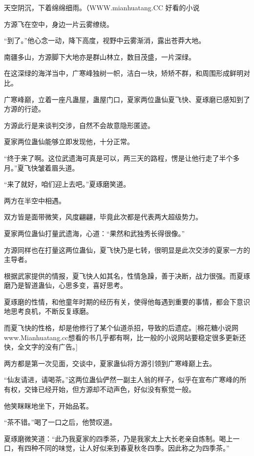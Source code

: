 
\begin{this_body}

天空阴沉，下着绵绵细雨。（WWW.mianhuatang.CC 好看的小说

方源飞在空中，身边一片云雾缭绕。

“到了。”他心念一动，降下高度，视野中云雾渐消，露出苍莽大地。

南疆多山，方源脚下大地亦是群山林立，数目茂盛，一片深绿。

在这深绿的海洋当中，广寒峰独树一帜，洁白一块，矫矫不群，和周围形成鲜明对比。

广寒峰巅，立着一座凡蛊屋，蛊屋门口，夏家两位蛊仙夏飞快、夏琢磨已感知到了方源的行迹。

方源此行是来谈判交涉，自然不会故意隐形匿迹。

夏家两位蛊仙能够立即发现他，十分正常。

“终于来了啊。这位武遗海可真是可以，两三天的路程，愣是让他行走了半个多月。”夏飞快皱着眉头道。

“来了就好，咱们迎上去吧。”夏琢磨笑道。

两方在半空中相遇。

双方皆是面带微笑，风度翩翩，毕竟此次都是代表两大超级势力。

夏家两位蛊仙打量武遗海，心道：“果然和武独秀长得很像。”

方源同样也在打量这两位蛊仙，夏飞快乃是七转，很明显是此次交涉的夏家一方的主导者。

根据武家提供的情报，夏飞快人如其名，性情急躁，善于决断，战力很强。而夏琢磨乃是智道蛊仙，心思多变，喜好思考。

夏琢磨的性情，和他童年时期的经历有关，使得他每遇到重要的事情，都会下意识地思考良机，不断反复琢磨。

而夏飞快的性格，却是他修行了某个仙道杀招，导致的后遗症。[棉花糖小说网www.Mianhuatang.cc想看的书几乎都有啊，比一般的小说网站要稳定很多更新还快，全文字的没有广告。]

两方都是第一次见面，交谈中，夏家蛊仙将方源引领到广寒峰巅上去。

“仙友请进，请喝茶。”这两位蛊仙俨然一副主人翁的样子，似乎在宣布广寒峰的所有权，交锋已经开始，但方源却不动声色，好似没有察觉一般。

他笑眯眯地坐下，开始品茗。

“茶不错。”喝了一口之后，他赞叹道。

夏琢磨微笑道：“此乃我夏家的四季茶，乃是我家太上大长老亲自炼制。喝上一口，有四种不同的味觉，让人好似来到春夏秋冬四季。因此称之为四季茶。”


\end{this_body}
